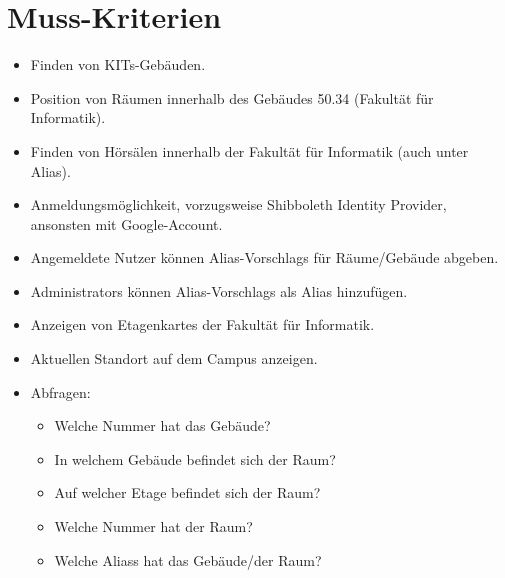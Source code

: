 \section{Muss-Kriterien}

\begin{itemize}

    \item Finden von \Glspl{KIT}-Gebäuden.
    \item Position von Räumen innerhalb des Gebäudes 50.34 (Fakultät für Informatik).
    \item Finden von Hörsälen innerhalb der Fakultät für Informatik (auch unter Alias).
    \item Anmeldungsmöglichkeit, vorzugsweise Shibboleth Identity Provider, ansonsten mit Google-Account.
    \item Angemeldete Nutzer können \Glspl{Alias-Vorschlag} für Räume/Gebäude abgeben.
    \item \Glspl{Administrator} können \Glspl{Alias-Vorschlag} als \Gls{Alias} hinzufügen.
    \item Anzeigen von \Glspl{Etagenkarte} der Fakultät für Informatik.
    \item Aktuellen Standort auf dem \Gls{Campus} anzeigen.
    \item Abfragen:
        \begin{itemize}
            \item Welche Nummer hat das Gebäude?
            \item In welchem Gebäude befindet sich der Raum?
            \item Auf welcher Etage befindet sich der Raum?
            \item Welche Nummer hat der Raum?
            \item Welche \Glspl{Alias} hat das Gebäude/der Raum?
        \end{itemize}

\end{itemize}

